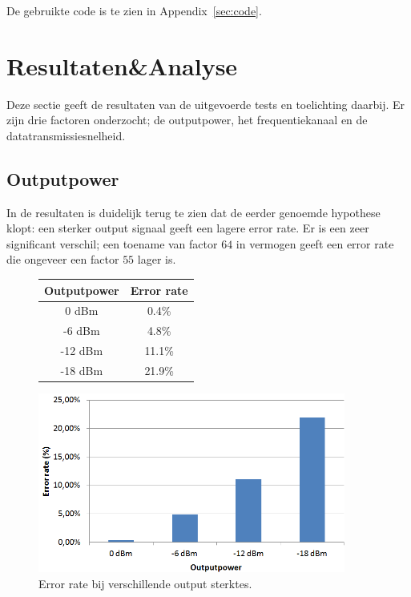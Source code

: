 \documentclass[a4paper,10pt]{article}
\begin{document}
De gebruikte code is te zien in Appendix~\ref{sec:code}.

\section{Resultaten\&Analyse}
Deze sectie geeft de resultaten van de uitgevoerde tests en toelichting daarbij. Er zijn drie factoren onderzocht; de outputpower, het frequentiekanaal en de datatransmissiesnelheid.

\subsection{Outputpower}
In de resultaten is duidelijk terug te zien dat de eerder genoemde hypothese klopt: een sterker output signaal geeft een lagere error rate. Er is een zeer significant verschil; een toename van factor $64$ in vermogen geeft een error rate die ongeveer een factor $55$ lager is.

\begin{figure}[h!]
    \begin{minipage}{\textwidth}
        \begin{minipage}{0.49\textwidth}
            \centering
            \begin{tabular}{cc}\hline
                Outputpower &  Error rate   \\ \hline
                0 dBm       &  0.4\%        \\
                -6 dBm      &  4.8\%        \\
                -12 dBm     &  11.1\%       \\
                -18 dBm     &  21.9\%	\\ \hline
            \end{tabular}
        \end{minipage}
        \hfill
        \begin{minipage}{0.49\textwidth}
            \centering
            \includegraphics[width=0.9\textwidth]{outputpower.png}
        \end{minipage}
        \caption{Error rate bij verschillende output sterktes.}
    \end{minipage}
\end{figure}
\end{document}

